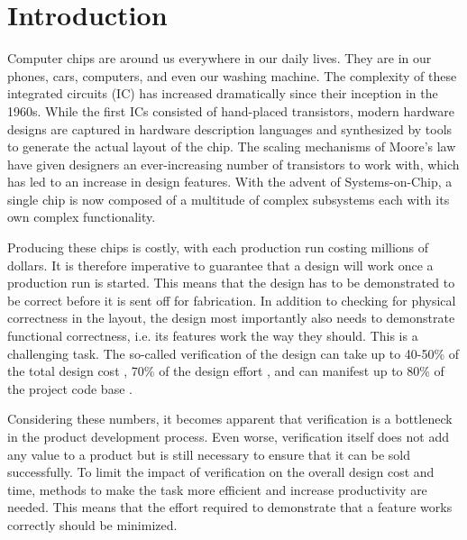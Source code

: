 
\chapter{Introduction} %

Computer chips are around us everywhere in our daily lives. They are in our phones, cars, computers, and even our washing machine. The complexity of these integrated circuits (IC) has increased dramatically since their
inception in the 1960s. While the first ICs consisted of hand-placed transistors, modern hardware designs are
captured in hardware description languages and synthesized by tools to generate the actual layout of the chip. The
scaling mechanisms of Moore's law have given designers an ever-increasing number of transistors to work with, which
has led to an increase in design features. With the advent of Systems-on-Chip, a single chip is now composed
of a multitude of complex subsystems each with its own complex functionality.

Producing these chips is costly, with each production run costing millions of dollars. It is therefore imperative to
guarantee that a design will work once a production run is started. This means that the design has to be demonstrated
to be correct before it is sent off for fabrication. In addition to checking for physical correctness in the layout,
the design most importantly also needs to demonstrate functional correctness, i.e. its features work the way they should. This is a challenging task. The
so-called verification of the design can take up to 40-50\% of the total design cost \cite{mehta2018asic}, 70\% of
the design effort \cite{bergeron2012writing}, and can manifest up to 80\% of the project code base \cite{bergeron2012writing}.

Considering these numbers, it becomes apparent that verification is a bottleneck in the product development process.
Even worse, verification itself does not add any value to a product but is still necessary to ensure that it can
be sold successfully. To limit the impact of verification on the overall design cost and time, methods to
make the task more efficient and increase productivity are needed. This means that the effort required to demonstrate
that a feature works correctly should be minimized.

